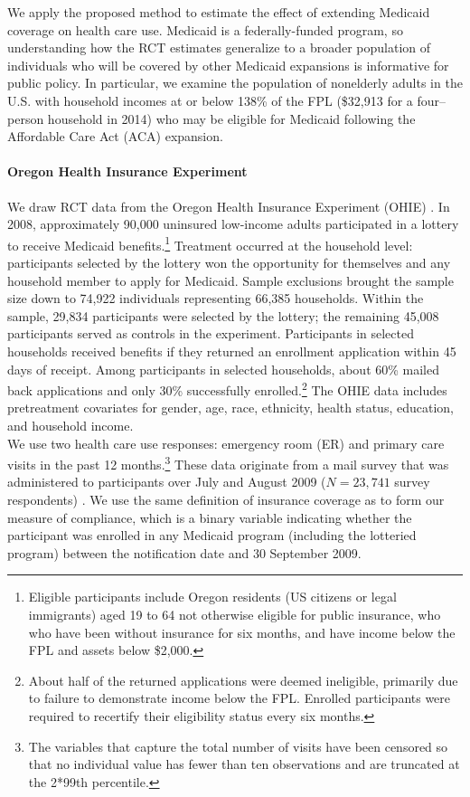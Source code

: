 \documentclass[12pt]{article}
\begin{document}
We apply the proposed method to estimate the effect of extending Medicaid coverage on health care use.  Medicaid is a federally-funded program, so understanding how the RCT estimates generalize to a broader population of individuals who will be covered by other Medicaid expansions is informative for public policy. In particular, we examine the population of nonelderly adults in the U.S. with household incomes at or below 138\% of the FPL (\$32,913 for a four--person household in 2014) who may be eligible for Medicaid following the Affordable Care Act (ACA) expansion.

\paragraph{Oregon Health Insurance Experiment}

We draw RCT data from the Oregon Health Insurance Experiment (OHIE) \citep{finkelstein2012,baicker2013,baicker2014,Taubman}.  In 2008, approximately 90,000 uninsured low-income adults participated in a lottery to receive Medicaid benefits.\footnote{Eligible participants include Oregon residents (US citizens or legal immigrants) aged 19 to 64 not otherwise eligible for public insurance, who who have been without insurance for six months, and have income below the FPL and assets below \$2,000.} Treatment occurred at the household level: participants selected by the lottery won the opportunity for themselves and any household member to apply for Medicaid. Sample exclusions brought the sample size down to 74,922 individuals representing 66,385 households.  Within the sample, 29,834 participants were selected by the lottery; the remaining 45,008 participants served as controls in the experiment.  Participants in selected households received benefits if they returned an enrollment application within 45 days of receipt. Among participants in selected households, about 60\% mailed back applications and only 30\% successfully enrolled.\footnote{About half of the returned applications were deemed ineligible, primarily due to failure to demonstrate income below the FPL. Enrolled participants were required to recertify their eligibility status every six months.} The OHIE data includes pretreatment covariates for gender, age, race, ethnicity, health status, education, and household income. \\

We use two health care use responses: emergency room (ER) and primary care visits in the past 12 months.\footnote{The variables that capture the total number of visits have been censored so that no individual value has fewer than ten observations and are truncated at the 2*99th percentile.} These data originate from a mail survey that was administered to participants over July and August 2009 ($N = 23,741$ survey respondents) \cite{finkelstein2012}. We use the same definition of insurance coverage as \citet{finkelstein2012} to form our measure of compliance, which is a binary variable indicating whether the participant was enrolled in any Medicaid program (including the lotteried program) between the notification date and 30 September 2009. 
\end{document}
